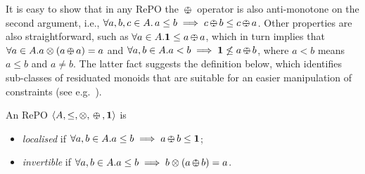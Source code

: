 \documentclass{llncs}
\newcommand{\shortNoProof}[1]{ }
\def\monid{{\mathbf 0}}
\def\monop{\otimes}
\def\odiv{\, {\ominus\hspace{-7.7pt} \div} \,}
\def\monid{\mathbf{1}}
\begin{document}
\shortNoProof{
\begin{proof} ($\Longrightarrow$)
The first item is immediate. Now, let $a \leq b$. Since $b \leq (b \otimes c) \odiv c$ and 
$c \otimes (a \odiv c) \leq a$, the second item follows.

($\Longleftarrow$)
Using the monotonicity of $\odiv$ from $b \monop c \leq a$ we get
 $(b \monop c) \odiv b \leq a \odiv b$, and by the first item
 $c \leq a \odiv b$.
 From the latter by the monotonicity of $\otimes$ we get
 $b \otimes c \leq b \otimes (a \odiv b)$, and by the first item
 $b \monop c \leq a$.
\qed
\end{proof}
}

It is easy to show that in any RePO the $\odiv$ operator is also anti-monotone on the second argument, i.e., 
$\forall a, b, c \in A.\, a\leq b \implies  c\odiv b \leq c \odiv a$.
%
Other properties are also straightforward, such as 
$\forall a\in A. \monid \leq a \odiv a$, which in turn implies 
that $\forall a\in A. a \monop (a \odiv a) = a$ and
%
%
$\forall a, b \in A. a < b \implies \monid \not \leq a \odiv b$, where
$a < b$ means $a \leq b$ and $a \neq b$.
%
%
%
The latter fact suggests the definition below, which identifies sub-classes 
of residuated monoids that are suitable for an easier manipulation
of constraints (see e.g.~\cite{ecai06}).

\begin{definition}
	An RePO $\langle A, \leq, \monop, \odiv, \monid \rangle$ is
	\begin{itemize}
		\item
		\emph{localised} if $\forall a, b \in A. a \leq b \implies a \odiv b \leq \monid$;
		\item
		\emph{invertible} if $\forall a, b \in A. a \leq b \implies b \monop (a \odiv b) = a$.
	\end{itemize}
\end{definition}
\end{document}
